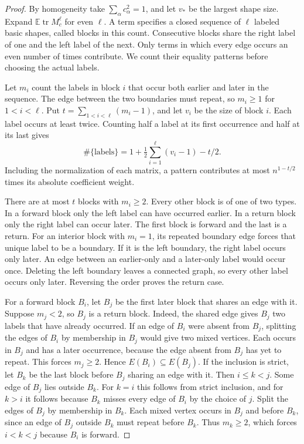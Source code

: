 \documentclass[preprints,article,submit,oneauthor]{Definitions/mdpi}
\newcommand{\E}{\mathbb E}
\newcommand{\tr}{\operatorname{tr}}
\begin{document}
\begin{proof}
By homogeneity take \(\sum_\alpha c_\alpha^2=1\), and let \(v_\ast\) be the
largest shape size. Expand \(\E\tr M_c^\ell\) for even \(\ell\).
A term specifies a closed sequence of \(\ell\) labeled basic shapes,
called blocks in this count. Consecutive blocks share the right label
of one and the left label of the next. Only terms in which every edge
occurs an even number of times contribute. We count their equality
patterns before choosing the actual labels.

Let \(m_i\) count the labels in block \(i\) that occur both earlier and
later in the sequence. The edge between the two boundaries must
repeat, so \(m_i\ge1\) for \(1<i<\ell\). Put
\(t=\sum_{1<i<\ell}(m_i-1)\), and let \(v_i\) be the size of block
\(i\). Each label occurs at least twice. Counting half a label at
its first occurrence and half at its last gives
\[
 \#\{\text{labels}\}=1+\tfrac12\sum_{i=1}^\ell(v_i-1)-t/2.
\]
Including the normalization of each matrix, a pattern contributes at
most \(n^{1-t/2}\) times its absolute coefficient weight.

There are at most \(t\) blocks with \(m_i\ge2\). Every other block is
of one of two types. In a forward block only the left label can have
occurred earlier. In a return block only the right label can occur
later. The first block is forward and the last is a return. For an
interior block with \(m_i=1\), its repeated boundary edge forces that
unique label to be a boundary. If it is the left boundary, the right
label occurs only later. An edge between an earlier-only and a
later-only label would occur once. Deleting the left boundary leaves
a connected graph, so every other label occurs only later. Reversing
the order proves the return case.

For a forward block \(B_i\), let \(B_j\) be the first later block that
shares an edge with it. Suppose \(m_j<2\), so \(B_j\) is a return block.
Indeed, the shared edge gives \(B_j\) two labels that have already occurred.
If an edge of \(B_i\) were absent from \(B_j\), splitting the edges of
\(B_i\) by membership in \(B_j\) would give two mixed vertices. Each occurs
in \(B_j\) and has a later occurrence, because the edge absent from
\(B_j\) has yet to repeat. This forces \(m_j\ge2\). Hence
\(E(B_i)\subseteq E(B_j)\). If the inclusion is strict, let \(B_k\) be the
last block before \(B_j\) sharing an edge with it. Then \(i\le k<j\).
Some edge of \(B_j\) lies outside \(B_k\). For \(k=i\) this follows from
strict inclusion, and for \(k>i\) it follows because \(B_k\) misses every
edge of \(B_i\) by the choice of \(j\). Split the edges of \(B_j\) by
membership in \(B_k\). Each mixed vertex occurs in \(B_j\) and before
\(B_k\), since an edge of \(B_j\) outside \(B_k\) must repeat before
\(B_k\). Thus \(m_k\ge2\), which forces \(i<k<j\) because \(B_i\) is forward.


\end{proof}
\end{document}
